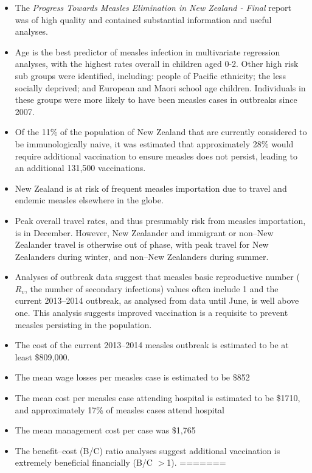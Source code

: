 \documentclass{article}
\begin{document}
\begin{itemize}
\item The \emph {Progress Towards Measles Elimination in New Zealand - Final} report was of high quality and contained substantial information and useful analyses.
\item Age is the best predictor of measles infection in multivariate regression analyses, with the highest rates overall in children aged 0-2. Other high risk sub groups were identified, including:  people of Pacific ethnicity; the less socially deprived; and European and Maori school age children. Individuals in these groups were more likely to have been measles cases in outbreaks since 2007.
\item Of the 11\% of the population of New Zealand that are currently considered to be immunologically naive, it was estimated that approximately 28\% would require additional vaccination to ensure measles does not persist, leading to an additional 131,500 vaccinations.
\item New Zealand is at risk of frequent measles importation due to travel and endemic measles elsewhere in the globe.
\item Peak overall travel rates, and thus presumably risk from measles importation, is in December. However, New Zealander and immigrant or non--New Zealander travel is otherwise out of phase, with peak travel for New Zealanders during winter, and non--New Zealanders during summer.
\item Analyses of outbreak data suggest that measles basic reproductive number ($R_v$, the number of secondary infections) values often include 1 and the current 2013--2014 outbreak, as analysed from data until June, is well above one. This analysis suggests improved vaccination is a requisite to prevent measles persisting in the population.
\item The cost of the current 2013--2014 measles outbreak is estimated to be at least \$809,000.
\item The mean wage losses per measles case is estimated to be \$852
\item The mean cost per measles case attending hospital is estimated to be \$1710, and approximately 17\% of measles cases attend hospital
\item The mean management cost per case was \$1,765
\item The benefit--cost (B/C) ratio analyses suggest additional vaccination is extremely beneficial financially (B/C $>$1).
=======

\end{itemize}
\end{document}
